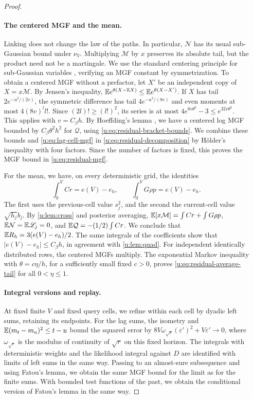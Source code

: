 \begin{proof}
\paragraph{The centered MGF and the mean.}
Linking does not change the law of the paths. In particular, $\mathcal N$ has its usual sub-Gaussian bound under $\nu_V$. Multiplying $\mathcal M$ by $x$ preserves its absolute tail, but the product need not be a martingale. We use the standard centering principle for sub-Gaussian variables
\cite[Lemma~2.6.8]{vershynin-2018}, verifying an MGF constant by symmetrization.
To obtain a centered MGF without a prefactor, let $X'$ be an independent copy of $X=x\mathcal M$. By Jensen's inequality, $\mathbb E e^{\theta(X-\mathbb E X)}\le\mathbb E e^{\theta(X-X')}$.
If $X$ has tail $2e^{-u^2/(2v)}$, the symmetric difference has tail $4e^{-u^2/(8v)}$ and even moments at most $4(8v)^ll!$. Since $(2l)!\ge(l!)^2$, its series is at most $4e^{8v\theta^2}-3\le e^{32v\theta^2}$.
This applies with $v=C_\beta h$. By Hoeffding's lemma \cite[Lemma~2.2]{boucheron-lugosi-massart-2013}, we have a centered log MGF bounded by $C_\beta\theta^2h^2$ for $\mathcal Q$, using \eqref{u:eq:residual-bracket-bounds}. We combine these bounds and \eqref{u:eq:lag-cell-mgf} in \eqref{u:eq:residual-decomposition} by H\"older's inequality with four factors. Since the number of factors is fixed, this proves the MGF bound in \eqref{u:eq:residual-mgf}.

For the mean, we have, on every deterministic grid, the identities
\begin{equation}\label{u:eq:residual-mean-integrals}
 \int_0^VCr=e(V)-e_h,\qquad
 \int_0^VG\rho p=e(V)-e_h.
\end{equation}
The first uses the previous-cell value $s_j^2$, and the second the current-cell value $\sqrt{h_j}b_j$. By \cref{u:lem:cross} and posterior averaging, $\mathbb E[x\mathcal M]=\int Cr+\int G\rho p$, $\mathbb E\mathcal N=\mathbb E\mathscr L_j=0$, and $\mathbb E\mathcal Q=-(1/2)\int Cr$.
We conclude that $\mathbb E R_h=3(e(V)-e_h)/2$. The same integrals of the coefficients show that $|e(V)-e_h|\le C_\beta h$, in agreement with \cref{u:lem:quad}. For independent identically distributed rows, the centered MGFs multiply. The exponential Markov inequality with $\theta=c\eta/h$, for a sufficiently small fixed $c>0$, proves \eqref{u:eq:residual-average-tail} for all $0<\eta\le1$.

\paragraph{Integral versions and replay.}
At fixed finite $V$ and fixed query cells, we refine within each cell by dyadic left sums, retaining its endpoints. For the lag sums, the isometry and $\mathbb E(m_t-m_u)^2\le t-u$ bound the squared error by $8V\omega_{\sqrt r}(\varepsilon')^2+V\varepsilon'\to0$, where $\omega_{\sqrt r}$ is the modulus of continuity of $\sqrt r$ on this fixed horizon. The integrals with deterministic weights and the likelihood integral against $D$ are identified with limits of left sums in the same way. Passing to an almost-sure subsequence and using Fatou's lemma, we obtain the same MGF bound for the limit as for the finite sums. With bounded test functions of the past, we obtain the conditional version of Fatou's lemma in the same way.


\end{proof}
